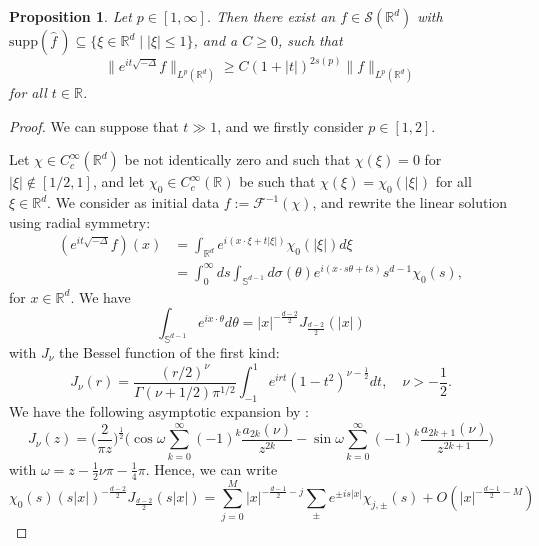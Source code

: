 \documentclass{amsart}
\newtheorem{proposition}[theorem]{Proposition}
\theoremstyle{definition}
\newcommand{\R}{\mathbb{R}}
\newcommand {\Rd}{\mathbb{R}^{d}}
\newcommand {\supp}{\mathrm{supp}}
\newcommand{\wh}{\widehat}
\newcommand {\Sw}{\mathcal{S}}
\newcommand {\F}{{\mathcal{F}}}
\numberwithin{equation}{section}
\begin{document}
\begin{proposition}
\label{prop:SharpGrowth}
Let $p \in [1,\infty]$. Then there exist an $f \in \Sw(\R^d)$ with $\supp (\wh{f}\,) \subseteq \{\xi\in\Rd\mid |\xi|\leq 1\}$, and a $C\geq0$, such that
\[
\| e^{it \sqrt{-\Delta}} f \|_{L^p(\R^d)} \geq C (1+|t|)^{2s(p)} \| f \|_{L^p(\R^d)}
\]
for all $t\in\R$.
\end{proposition}
\begin{proof}
We can suppose that $t \gg 1$, and we firstly consider $p \in [1,2]$.

 Let $\chi \in C^\infty_c(\Rd)$ be not identically zero and such that $\chi(\xi)=0$ for $|\xi|\notin [1/2,1]$, and let $\chi_{0}\in C^{\infty}_{c}(\R)$ be such that $\chi(\xi) = \chi_0(|\xi|)$ for all $\xi\in\Rd$. We consider as initial data $f:=\F^{-1}(\chi)$, and rewrite the linear solution using radial symmetry:
\begin{equation*}
\begin{split}
(e^{it \sqrt{- \Delta}} f)(x) &= \int_{\R^d} e^{i(x\cdot\xi + t |\xi|)} \chi_0(|\xi|) d\xi \\
&= \int_0^\infty ds \int_{\mathbb{S}^{d-1}} d \sigma(\theta) e^{i(x\cdot s \theta + t s)} s^{d-1} \chi_0(s),
\end{split}
\end{equation*}
for $x\in\Rd$. We have
\begin{equation*}
\int_{\mathbb{S}^{d-1}} e^{i x\cdot\theta} d\theta = |x|^{-\frac{d-2}{2}} J_{\frac{d-2}{2}}(|x|)
\end{equation*}
with $J_\nu$ the Bessel function of the first kind:
\begin{equation*}
J_\nu(r) = \frac{(r/2)^\nu}{\Gamma(\nu + 1/2) \pi^{1/2}} \int_{-1}^1 e^{ir t} (1-t^2)^{\nu - \frac{1}{2}} dt, \quad \nu > -\frac{1}{2}.
\end{equation*}
We have the following asymptotic expansion by \cite[Section~10.17]{OlverMaximon2010}:
\begin{equation*}
J_\nu(z) = \big( \frac{2}{\pi z} \big)^{\frac{1}{2}} \big( \cos \omega \sum_{k=0}^\infty (-1)^k \frac{a_{2k}(\nu)}{z^{2k}} - \sin \omega \sum_{k=0}^\infty (-1)^{k} \frac{a_{2k+1}(\nu)}{z^{2k+1}} \big)
\end{equation*}
with $\omega = z - \frac{1}{2} \nu \pi - \frac{1}{4} \pi$. Hence, we can write
\begin{equation*}
\chi_0(s) (s|x|)^{-\frac{d-2}{2}} J_{\frac{d-2}{2}}(s |x|) = \sum_{j=0}^M |x|^{-\frac{d-1}{2}-j} \sum_{\pm} e^{\pm is |x|} \chi_{j,\pm}(s) + O(|x|^{-\frac{d-1}{2}-M})

\end{equation*}
\end{proof}
\end{document}
